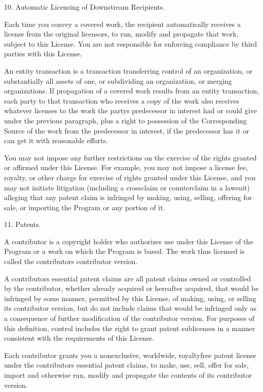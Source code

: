 \documentclass[letterpaper,10pt,english]{sphinxmanual}
\begin{document}
\begin{sphinxVerbatim}[commandchars=\\\{\}]
  10. Automatic Licensing of Downstream Recipients.

  Each time you convey a covered work, the recipient automatically
receives a license from the original licensors, to run, modify and
propagate that work, subject to this License.  You are not responsible
for enforcing compliance by third parties with this License.

  An \PYGZdq{}entity transaction\PYGZdq{} is a transaction transferring control of an
organization, or substantially all assets of one, or subdividing an
organization, or merging organizations.  If propagation of a covered
work results from an entity transaction, each party to that
transaction who receives a copy of the work also receives whatever
licenses to the work the party\PYGZsq{}s predecessor in interest had or could
give under the previous paragraph, plus a right to possession of the
Corresponding Source of the work from the predecessor in interest, if
the predecessor has it or can get it with reasonable efforts.

  You may not impose any further restrictions on the exercise of the
rights granted or affirmed under this License.  For example, you may
not impose a license fee, royalty, or other charge for exercise of
rights granted under this License, and you may not initiate litigation
(including a cross\PYGZhy{}claim or counterclaim in a lawsuit) alleging that
any patent claim is infringed by making, using, selling, offering for
sale, or importing the Program or any portion of it.

  11. Patents.

  A \PYGZdq{}contributor\PYGZdq{} is a copyright holder who authorizes use under this
License of the Program or a work on which the Program is based.  The
work thus licensed is called the contributor\PYGZsq{}s \PYGZdq{}contributor version\PYGZdq{}.

  A contributor\PYGZsq{}s \PYGZdq{}essential patent claims\PYGZdq{} are all patent claims
owned or controlled by the contributor, whether already acquired or
hereafter acquired, that would be infringed by some manner, permitted
by this License, of making, using, or selling its contributor version,
but do not include claims that would be infringed only as a
consequence of further modification of the contributor version.  For
purposes of this definition, \PYGZdq{}control\PYGZdq{} includes the right to grant
patent sublicenses in a manner consistent with the requirements of
this License.

  Each contributor grants you a non\PYGZhy{}exclusive, worldwide, royalty\PYGZhy{}free
patent license under the contributor\PYGZsq{}s essential patent claims, to
make, use, sell, offer for sale, import and otherwise run, modify and
propagate the contents of its contributor version.


\end{sphinxVerbatim}
\end{document}
